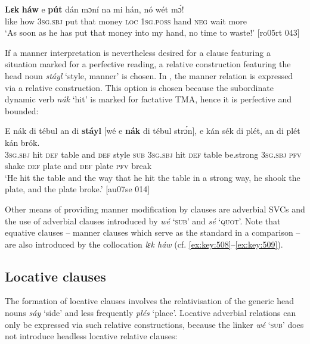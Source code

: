 \ea%
    \label{ex:key:1487}
    \gll \textbf{Lɛk}  \textbf{háw}   e    \textbf{pút}  dán  mɔní  na  mi    hán,    nó  wét    mɔ́!\\
like  how    \textsc{3sg.sbj}  put  that  money  \textsc{loc}  \textsc{1sg.poss}  hand  \textsc{neg}  wait    more\\

\glt ‘As soon as he has put that money into my hand, no time to waste!’ [ro05rt 043]
\z

If a manner interpretation is nevertheless desired for a clause featuring a situation marked for a perfective reading, a relative construction featuring the head noun \textit{stáyl} ‘style, manner’ is chosen. In , the manner relation is expressed via a relative construction. This option is chosen because the subordinate dynamic verb \textit{nák} ‘hit’ is marked for factative TMA, hence it is perfective and bounded: 


\ea%
    \label{ex:key:1488}
    \gll E    nák  di  tébul  an  di  \textbf{stáyl} [wé\textbf{}   e    \textbf{nák}  di  tébul
strɔ́n],    e    kán  sék    di  plét,    an  di  plét    kán  brók.\\
\textsc{3sg.sbj}  hit  \textsc{def}  table  and   \textsc{def}  style   \phantom{[}\textsc{sub}    \textsc{3sg.sbj}  hit  \textsc{def}  table
be.strong   \textsc{3sg.sbj}  \textsc{pfv}  shake  \textsc{def}  plate  and  \textsc{def}  plate  \textsc{pfv}  break\\

\glt ‘He hit the table and the way that he hit the table in a strong way, he shook the plate,
and the plate broke.’ [au07se 014]
\z

Other means of providing manner modification by clauses are adverbial SVCs and the use of adverbial clauses introduced by \textit{wé} ‘\textsc{sub}’ and \textit{sé} ‘\textsc{quot}’. Note that equative clauses – manner clauses which serve as the standard in a comparison – are also introduced by the collocation \textit{lɛk háw} (cf. \ref{ex:key:508}–\ref{ex:key:509}).

\subsection{Locative clauses}

The formation of locative clauses involves the relativisation of the generic head nouns \textit{sáy} ‘side’ and less frequently \textit{plés} ‘place’. Locative adverbial relations can only be expressed via such relative constructions, because the linker \textit{wé} ‘\textsc{sub}’ does not introduce headless locative relative clauses: 


